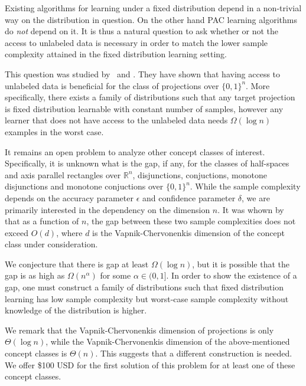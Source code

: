 \documentclass[12pt]{colt2019}
\newcommand{\R}{\mathbb{R}}
\begin{document}
Existing algorithms for learning under a fixed distribution depend in a
non-trivial way on the distribution in question. On the other hand PAC learning
algorithms do \emph{not} depend on it. It is thus a natural question to ask
whether or not the access to unlabeled data is necessary in order to match the
lower sample complexity attained in the fixed distribution learning setting.

This question was studied by~\cite{Darnstadt-Simon-Szorenyi-2013} and
\cite{Golovnev-Pal-Szorenyi-2019}. They have shown that having access to
unlabeled data is beneficial for the class of projections over $\{0,1\}^n$. More
specifically, there exists a family of distributions such that any target
projection is fixed distribution learnable with constant number of samples,
however any learner that does not have access to the unlabeled data needs
$\Omega(\log n)$ examples in the worst case.

It remains an open problem to analyze other concept classes of interest.
Specifically, it is unknown what is the gap, if any, for the classes of
half-spaces and axis parallel rectangles over $\R^n$, disjunctions, conjuctions,
monotone disjunctions and monotone conjuctions over $\{0,1\}^n$. While the sample
complexity depends on the accuracy parameter $\epsilon$ and confidence parameter
$\delta$, we are primarily interested in the dependency on the dimension $n$. It was whown by~\cite{Darnstadt-Simon-Szorenyi-2013} that as a function of $n$, the gap between these two sample complexities does not exceed $O(d)$, where $d$ is the Vapnik-Chervonenkis dimension of the concept class under consideration.

We conjecture that there is gap at least $\Omega(\log n)$, but it is possible
that the gap is as high as $\Omega(n^\alpha)$ for some $\alpha \in (0,1]$. In
order to show the existence of a gap, one must construct a family of
distributions such that fixed distribution learning has low sample complexity
but worst-case sample complexity without knowledge of the distribution is
higher.

We remark that the Vapnik-Chervonenkis dimension of projections is only
$\Theta(\log n)$, while the Vapnik-Chervonenkis dimension of the above-mentioned
concept classes is $\Theta(n)$. This suggests that a different construction is
needed. We offer \$100 USD for the first solution of this problem for at least
one of these concept classes.


\end{document}
